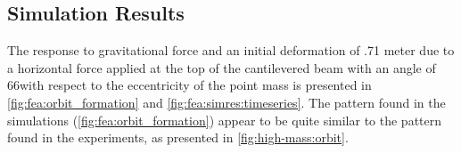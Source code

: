 \documentclass{article}
\begin{document}
\subsection{Simulation Results}

The response to gravitational force and an initial deformation of .71 meter due to a horizontal force applied at the top of the  cantilevered beam with an angle of 66\textdegree with respect to the eccentricity of the point mass is presented in  \autoref{fig:fea:orbit_formation} and \autoref{fig:fea:simres:timeseries}. The pattern found in the simulations (\autoref{fig:fea:orbit_formation}) appear to be quite similar to the pattern found in the experiments, as presented in  \autoref{fig:high-mass:orbit}.


\end{document}
